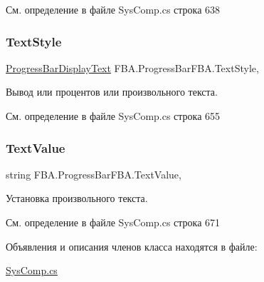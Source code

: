 См. определение в файле Sys\+Comp.\+cs строка 638

\mbox{\label{class_f_b_a_1_1_progress_bar_f_b_a_a3b5aa95a85495f4da92512c763ffbfa3}} 
\subsubsection{\texorpdfstring{Text\+Style}{TextStyle}}
{\footnotesize\ttfamily \mbox{\hyperlink{namespace_f_b_a_a3379f961332d4dfe27911508655249b2}{Progress\+Bar\+Display\+Text}} F\+B\+A.\+Progress\+Bar\+F\+B\+A.\+Text\+Style\hspace{0.3cm}{\ttfamily [get]}, {\ttfamily [set]}}



Вывод или процентов или произвольного текста. 



См. определение в файле Sys\+Comp.\+cs строка 655

\mbox{\label{class_f_b_a_1_1_progress_bar_f_b_a_a464443c878e8ec305ed49b457fff9ea9}} 
\subsubsection{\texorpdfstring{Text\+Value}{TextValue}}
{\footnotesize\ttfamily string F\+B\+A.\+Progress\+Bar\+F\+B\+A.\+Text\+Value\hspace{0.3cm}{\ttfamily [get]}, {\ttfamily [set]}}



Установка произвольного текста. 



См. определение в файле Sys\+Comp.\+cs строка 671



Объявления и описания членов класса находятся в файле\+:\begin{DoxyCompactItemize}
\item 
\mbox{\hyperlink{_sys_comp_8cs}{Sys\+Comp.\+cs}}\end{DoxyCompactItemize}
